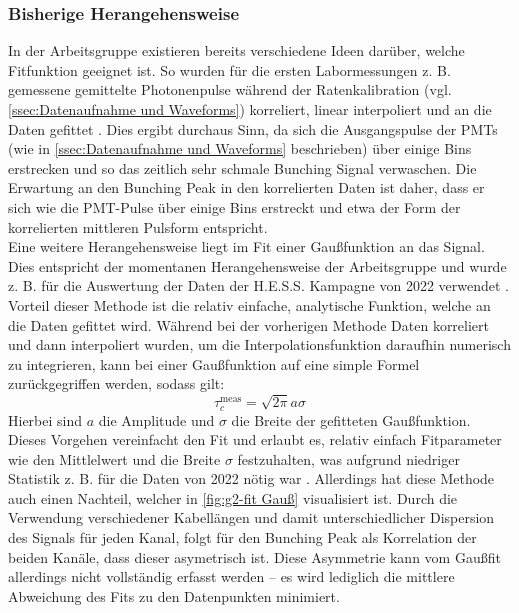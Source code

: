 \subsubsection{Bisherige Herangehensweise}
\label{sssec:Fitfunktion - Bisherige Herangehensweise}
In der Arbeitsgruppe existieren bereits verschiedene Ideen darüber, welche Fitfunktion geeignet ist. 
So wurden für die ersten Labormessungen z. B. gemessene gemittelte Photonenpulse während der Ratenkalibration (vgl. \autoref{ssec:Datenaufnahme und Waveforms}) korreliert, linear interpoliert und an die Daten gefittet \cite{zmijaOpticalIntensityInterferometry2021}. 
Dies ergibt durchaus Sinn, da sich die Ausgangspulse der PMTs (wie in \autoref{ssec:Datenaufnahme und Waveforms} beschrieben) über einige Bins erstrecken und so das zeitlich sehr schmale Bunching Signal verwaschen. 
Die Erwartung an den Bunching Peak in den korrelierten Daten ist daher, dass er sich wie die PMT-Pulse über einige Bins erstreckt und etwa der Form der korrelierten mittleren Pulsform entspricht. \\
Eine weitere Herangehensweise liegt im Fit einer Gaußfunktion an das Signal. 
Dies entspricht der momentanen Herangehensweise der Arbeitsgruppe und wurde z. B. für die Auswertung der Daten der H.E.S.S. Kampagne von 2022 verwendet \cite{zmijaFirstIntensityInterferometry2023}. 
Vorteil dieser Methode ist die relativ einfache, analytische Funktion, welche an die Daten gefittet wird. 
Während bei der vorherigen Methode Daten korreliert und dann interpoliert wurden, um die Interpolationsfunktion daraufhin numerisch zu integrieren, kann bei einer Gaußfunktion auf eine simple Formel zurückgegriffen werden, sodass gilt:
\begin{equation}
    \tau_c^{\mathrm{meas}} = \sqrt{2\pi} a\sigma
\end{equation}
Hierbei sind $a$ die Amplitude und $\sigma$ die Breite der gefitteten Gaußfunktion. 
Dieses Vorgehen vereinfacht den Fit und erlaubt es, relativ einfach Fitparameter wie den Mittlelwert und die Breite $\sigma$ festzuhalten, was aufgrund niedriger Statistik z. B. für die Daten von 2022 nötig war \cite{zmijaFirstIntensityInterferometry2023}. 
Allerdings hat diese Methode auch einen Nachteil, welcher in \autoref{fig:g2-fit Gauß} visualisiert ist. 
Durch die Verwendung verschiedener Kabellängen und damit unterschiedlicher Dispersion des Signals für jeden Kanal, folgt für den Bunching Peak als Korrelation der beiden Kanäle, dass dieser asymetrisch ist. 
Diese Asymmetrie kann vom Gaußfit allerdings nicht vollständig erfasst werden -- es wird lediglich die mittlere Abweichung des Fits zu den Datenpunkten minimiert. 
